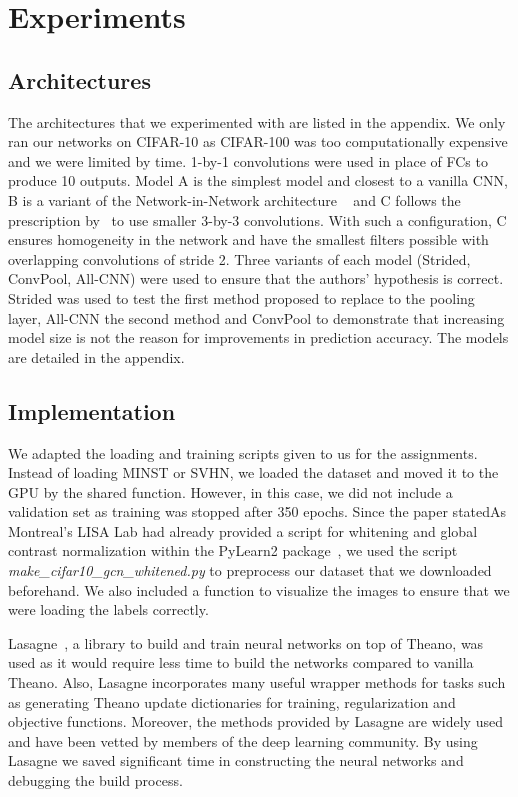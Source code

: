 \section{Experiments}

\subsection{Architectures}
The architectures that we experimented with are listed in the appendix. We only ran our networks on CIFAR-10 as CIFAR-100 was too computationally expensive and we were limited by time. 1-by-1 convolutions were used in place of FCs to produce 10 outputs. Model A is the simplest model and closest to a vanilla CNN, B is a variant of the Network-in-Network architecture ~\cite{lin2013network} and C follows the prescription by~\cite{simonyan2014very} to use smaller 3-by-3 convolutions. With such a configuration, C ensures homogeneity in the network and have the smallest filters possible with overlapping convolutions of stride 2. Three variants of each model (Strided, ConvPool, All-CNN) were used to ensure that the authors' hypothesis is correct. Strided was used to test the first method proposed to replace to the pooling layer, All-CNN the second method and ConvPool to demonstrate that increasing model size is not the reason for improvements in prediction accuracy. The models are detailed in the appendix.

\subsection{Implementation}
We adapted the loading and training scripts given to us for the assignments. Instead of loading MINST or SVHN, we loaded the dataset and moved it to the GPU by the shared function. However, in this case, we did not include a validation set as training was stopped after 350 epochs. Since the paper statedAs Montreal's LISA Lab had already provided a script for whitening and global contrast normalization within the PyLearn2 package~\cite{goodfellow2013pylearn2}, we used the script \textit{make\_cifar10\_gcn\_whitened.py} to preprocess our dataset that we downloaded beforehand. We also included a function to visualize the images to ensure that we were loading the labels correctly.

Lasagne~\cite{dieleman2015lasagne}, a library to build and train neural networks on top of Theano, was used as it would require less time to build the networks compared to vanilla Theano. Also, Lasagne incorporates many useful wrapper methods for tasks such as generating Theano update dictionaries for training, regularization and objective functions. Moreover, the methods provided by Lasagne are widely used and have been vetted by members of the deep learning community. By using Lasagne we saved significant time in constructing the neural networks and debugging the build process.

